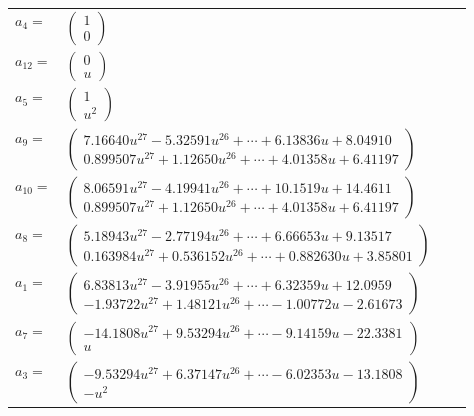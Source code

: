 \documentclass[1p]{elsarticle_modified}
\theoremstyle{definition}
\begin{document}
\begin{tabular}{m{7pt} m{180pt} m{7pt} m{180pt} }
\flushright $a_{4}=$&$\begin{pmatrix}1\\0\end{pmatrix}$ \\
\flushright $a_{12}=$&$\begin{pmatrix}0\\u\end{pmatrix}$ \\
\flushright $a_{5}=$&$\begin{pmatrix}1\\u^2\end{pmatrix}$ \\
\flushright $a_{9}=$&$\begin{pmatrix}7.16640 u^{27}-5.32591 u^{26}+\cdots+6.13836 u+8.04910\\0.899507 u^{27}+1.12650 u^{26}+\cdots+4.01358 u+6.41197\end{pmatrix}$ \\
\flushright $a_{10}=$&$\begin{pmatrix}8.06591 u^{27}-4.19941 u^{26}+\cdots+10.1519 u+14.4611\\0.899507 u^{27}+1.12650 u^{26}+\cdots+4.01358 u+6.41197\end{pmatrix}$ \\
\flushright $a_{8}=$&$\begin{pmatrix}5.18943 u^{27}-2.77194 u^{26}+\cdots+6.66653 u+9.13517\\0.163984 u^{27}+0.536152 u^{26}+\cdots+0.882630 u+3.85801\end{pmatrix}$ \\
\flushright $a_{1}=$&$\begin{pmatrix}6.83813 u^{27}-3.91955 u^{26}+\cdots+6.32359 u+12.0959\\-1.93722 u^{27}+1.48121 u^{26}+\cdots-1.00772 u-2.61673\end{pmatrix}$ \\
\flushright $a_{7}=$&$\begin{pmatrix}-14.1808 u^{27}+9.53294 u^{26}+\cdots-9.14159 u-22.3381\\u\end{pmatrix}$ \\
\flushright $a_{3}=$&$\begin{pmatrix}-9.53294 u^{27}+6.37147 u^{26}+\cdots-6.02353 u-13.1808\\- u^2\end{pmatrix}$ \\

\end{tabular}
\end{document}
